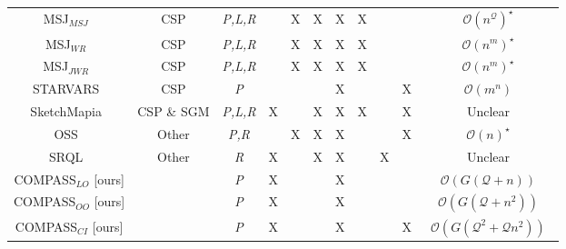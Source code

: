 {\begin{table*}[t]
\begin{center}
\begin{tabular}{|c|cc|cccc|ccc|c|}
            MSJ$_{MSJ}$~\cite{Papadias1998}             & CSP         & \textit{P,L,R} &   & X & X & X & X &   &   & $\mathcal{O}(n^\mathcal{Q})^{\star}$ \\ %
            MSJ$_{WR}$~\cite{Papadias1998}              & CSP         & \textit{P,L,R} &   & X & X & X & X &   &   & $\mathcal{O}(n^m)^{\star}$ \\ %
            MSJ$_{JWR}$~\cite{Papadias1998}             & CSP         & \textit{P,L,R} &   & X & X & X & X &   &   & $\mathcal{O}(n^m)^{\star}$ \\ %
            STARVARS~\cite{Lee2013}                     & CSP         & \textit{P}     &   &   &   & X &   &   & X & $\mathcal{O}(m^n)$ \\
            SketchMapia~\cite{Schwering2014,Jan2015}    & CSP \& SGM  & \textit{P,L,R} & X &   & X & X & X &   & X & Unclear \\         %
            OSS~\cite{Liu2003}                          & Other       & \textit{P,R}   &   & X & X & X &   &   & X & $\mathcal{O}(n)^{\star}$ \\ %
            SRQL~\cite{Dellapenna2012,Dellapenna2017}   & Other       & \textit{R}     & X &   & X & X &   & X &   & Unclear \\
            COMPASS$_{LO}$ [ours]                       &             & \textit{P}     & X &   &   & X &   &   &   & $\mathcal{O}(G(\mathcal{Q} + n))$ \\    
            COMPASS$_{OO}$ [ours]                       &             & \textit{P}     & X &   &   & X &   &   &   & $\mathcal{O}(G(\mathcal{Q} + n^2))$ \\  
            COMPASS$_{CI}$ [ours]                       &             & \textit{P}     & X &   &   & X &   &   & X & ~$\mathcal{O}(G(\mathcal{Q}^2 + \mathcal{Q} n^2))$~ \\
            
            
            

\end{tabular}
\end{center}
\end{table*}}
